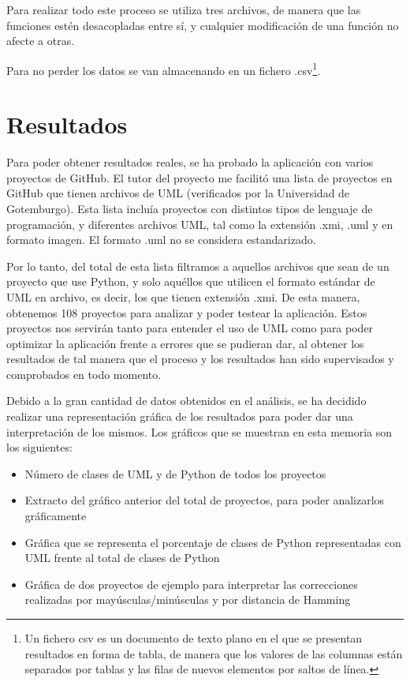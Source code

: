 \documentclass[a4paper, 12pt]{book}
\begin{document}
Para realizar todo este proceso se utiliza tres archivos, de manera que las funciones estén desacopladas
entre sí, y cualquier modificación de una función no afecte a otras.

Para no perder los datos se van almacenando en un fichero .csv\footnote{Un fichero csv es un documento de texto plano en el que se presentan resultados en forma de tabla, de manera que los valores de las columnas están separados por tablas y las filas de nuevos elementos por saltos de línea.}.


\cleardoublepage
\chapter{Resultados}

Para poder obtener resultados reales, se ha probado la aplicación con varios proyectos de GitHub.
El tutor del proyecto me facilitó una lista de proyectos en GitHub que tienen archivos de UML (verificados por la Universidad de Gotemburgo). Esta lista incluía proyectos con distintos tipos de lenguaje de programación,
y diferentes archivos UML, tal como la extensión .xmi, .uml y en formato imagen. El formato .uml
no se considera estandarizado.

Por lo tanto, del total de esta lista filtramos a aquellos archivos que sean de un proyecto
que use Python, y solo aquéllos que utilicen el formato estándar de UML en archivo, es decir, los
que tienen extensión .xmi. De esta manera, obtenemos 108 proyectos para analizar y poder testear la aplicación.
Estos proyectos nos servirán tanto para entender el uso de UML como para poder optimizar la aplicación
frente a errores que se pudieran dar, al obtener los resultados de tal manera que el proceso y los resultados han sido supervisados y comprobados en todo momento.

Debido a la gran cantidad de datos obtenidos en el análisis, se ha decidido realizar una representación gráfica de los resultados para poder dar una interpretación de los mismos. Los gráficos que se muestran en esta memoria son los siguientes:

\begin{itemize}
  \item Número de clases de UML y de Python de todos los proyectos
  \item Extracto del gráfico anterior del total de proyectos, para poder analizarlos gráficamente
  \item Gráfica que se representa el porcentaje de clases de Python representadas con UML frente al total
  de clases de Python
  \item Gráfica de dos proyectos de ejemplo para interpretar las correcciones realizadas por mayúsculas/minúsculas y
  por distancia de Hamming
\end{itemize}
\end{document}
